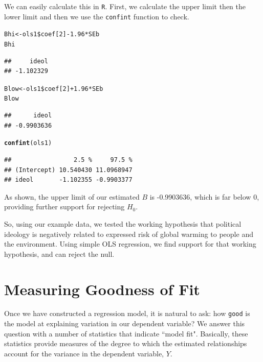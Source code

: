 \documentclass[11pt,openany]{book}\usepackage[]{graphicx}\usepackage[]{color}
\makeatletter
\newcommand{\hlnum}[1]{\textcolor[rgb]{0.686,0.059,0.569}{#1}}%
\newcommand{\hlopt}[1]{\textcolor[rgb]{0,0,0}{#1}}%
\newcommand{\hlstd}[1]{\textcolor[rgb]{0.345,0.345,0.345}{#1}}%
\newcommand{\hlkwb}[1]{\textcolor[rgb]{0.69,0.353,0.396}{#1}}%
\newcommand{\hlkwd}[1]{\textcolor[rgb]{0.737,0.353,0.396}{\textbf{#1}}}%
\newenvironment{kframe}{%
 \def\at@end@of@kframe{}%
 \ifinner\ifhmode%
  \def\at@end@of@kframe{\end{minipage}}%
  \begin{minipage}{\columnwidth}%
 \fi\fi%
 \def\FrameCommand##1{\hskip\@totalleftmargin \hskip-\fboxsep
 \colorbox{shadecolor}{##1}\hskip-\fboxsep
     \hskip-\linewidth \hskip-\@totalleftmargin \hskip\columnwidth}%
 \MakeFramed {\advance\hsize-\width
   \@totalleftmargin\z@ \linewidth\hsize
   \@setminipage}}%
 {\par\unskip\endMakeFramed%
 \at@end@of@kframe}
\newenvironment{knitrout}{}{} %
\renewenvironment{knitrout}{\begin{singlespace}}{\end{singlespace}}
\makeatother
\begin{document}
We can easily calculate this in \texttt{R}. First, we calculate the upper limit then the lower limit and then we use the \texttt{confint} function to check.   
\begin{knitrout}
\color{fgcolor}\begin{kframe}
\begin{alltt}
\hlstd{Bhi} \hlkwb{<-} \hlstd{ols1}\hlopt{\$}\hlstd{coef[}\hlnum{2}\hlstd{]} \hlopt{-} \hlnum{1.96} \hlopt{*} \hlstd{SEb}
\hlstd{Bhi}
\end{alltt}
\begin{verbatim}
##     ideol 
## -1.102329
\end{verbatim}
\begin{alltt}
\hlstd{Blow} \hlkwb{<-} \hlstd{ols1}\hlopt{\$}\hlstd{coef[}\hlnum{2}\hlstd{]} \hlopt{+} \hlnum{1.96} \hlopt{*} \hlstd{SEb}
\hlstd{Blow}
\end{alltt}
\begin{verbatim}
##      ideol 
## -0.9903636
\end{verbatim}
\begin{alltt}
\hlkwd{confint}\hlstd{(ols1)}
\end{alltt}
\begin{verbatim}
##                 2.5 %     97.5 %
## (Intercept) 10.540430 11.0968947
## ideol       -1.102355 -0.9903377
\end{verbatim}
\end{kframe}
\end{knitrout}

As shown, the upper limit of our estimated $B$ is -0.9903636, which is far below $0$, providing further support for rejecting $H_0$. 

So, using our example data, we tested the working hypothesis that political ideology is negatively related to expressed risk of global warming to people and the environment. Using simple OLS regression, we find support for that working hypothesis, and can reject the null.

\section{Measuring Goodness of Fit}

Once we have constructed a regression model, it is natural to ask: how \texttt{good} is the model at explaining variation in our dependent variable? We answer this question with a number of statistics that indicate ``model fit". Basically, these statistics provide measures of the degree to which the estimated relationships account for the variance in the dependent variable, $Y$.
\end{document}
